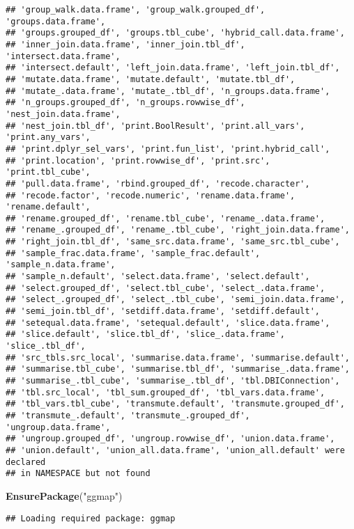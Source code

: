\documentclass[]{article}
\newenvironment{Shaded}{\begin{snugshade}}{\end{snugshade}}
\newcommand{\KeywordTok}[1]{\textcolor[rgb]{0.13,0.29,0.53}{\textbf{#1}}}
\newcommand{\StringTok}[1]{\textcolor[rgb]{0.31,0.60,0.02}{#1}}
\newcommand{\NormalTok}[1]{#1}
\begin{document}
\begin{verbatim}
## 'group_walk.data.frame', 'group_walk.grouped_df', 'groups.data.frame',
## 'groups.grouped_df', 'groups.tbl_cube', 'hybrid_call.data.frame',
## 'inner_join.data.frame', 'inner_join.tbl_df', 'intersect.data.frame',
## 'intersect.default', 'left_join.data.frame', 'left_join.tbl_df',
## 'mutate.data.frame', 'mutate.default', 'mutate.tbl_df',
## 'mutate_.data.frame', 'mutate_.tbl_df', 'n_groups.data.frame',
## 'n_groups.grouped_df', 'n_groups.rowwise_df', 'nest_join.data.frame',
## 'nest_join.tbl_df', 'print.BoolResult', 'print.all_vars', 'print.any_vars',
## 'print.dplyr_sel_vars', 'print.fun_list', 'print.hybrid_call',
## 'print.location', 'print.rowwise_df', 'print.src', 'print.tbl_cube',
## 'pull.data.frame', 'rbind.grouped_df', 'recode.character',
## 'recode.factor', 'recode.numeric', 'rename.data.frame', 'rename.default',
## 'rename.grouped_df', 'rename.tbl_cube', 'rename_.data.frame',
## 'rename_.grouped_df', 'rename_.tbl_cube', 'right_join.data.frame',
## 'right_join.tbl_df', 'same_src.data.frame', 'same_src.tbl_cube',
## 'sample_frac.data.frame', 'sample_frac.default', 'sample_n.data.frame',
## 'sample_n.default', 'select.data.frame', 'select.default',
## 'select.grouped_df', 'select.tbl_cube', 'select_.data.frame',
## 'select_.grouped_df', 'select_.tbl_cube', 'semi_join.data.frame',
## 'semi_join.tbl_df', 'setdiff.data.frame', 'setdiff.default',
## 'setequal.data.frame', 'setequal.default', 'slice.data.frame',
## 'slice.default', 'slice.tbl_df', 'slice_.data.frame', 'slice_.tbl_df',
## 'src_tbls.src_local', 'summarise.data.frame', 'summarise.default',
## 'summarise.tbl_cube', 'summarise.tbl_df', 'summarise_.data.frame',
## 'summarise_.tbl_cube', 'summarise_.tbl_df', 'tbl.DBIConnection',
## 'tbl.src_local', 'tbl_sum.grouped_df', 'tbl_vars.data.frame',
## 'tbl_vars.tbl_cube', 'transmute.default', 'transmute.grouped_df',
## 'transmute_.default', 'transmute_.grouped_df', 'ungroup.data.frame',
## 'ungroup.grouped_df', 'ungroup.rowwise_df', 'union.data.frame',
## 'union.default', 'union_all.data.frame', 'union_all.default' were declared
## in NAMESPACE but not found
\end{verbatim}

\begin{Shaded}
\begin{Highlighting}[]
\KeywordTok{EnsurePackage}\NormalTok{(}\StringTok{"ggmap"}\NormalTok{)}
\end{Highlighting}
\end{Shaded}

\begin{verbatim}
## Loading required package: ggmap
\end{verbatim}
\end{document}
